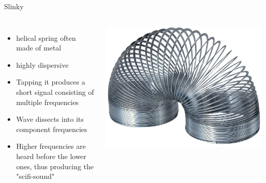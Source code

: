 \documentclass{beamer}
\begin{document}
	\begin{frame} {Slinky}
	\begin{columns}
		\begin{itemize}
			\item
			helical spring often made of metal
			\item
			highly dispersive
			\item
			Tapping it produces a short signal consisting of multiple frequencies
			\item
			Wave dissects into its component frequencies 
			\item
			Higher frequencies are heard before the lower ones, thus producing the "scifi-sound"
			\end{itemize}
			\includegraphics [scale=0.08]{images/slinky.jpg}
			
		\end{columns}
	\end{frame}
	
\end{document}
